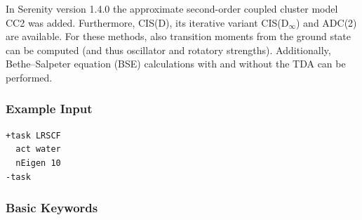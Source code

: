 \documentclass[bibliography=totocnumbered,a4paper,10pt,oneside]{scrbook}
\begin{document}
\noindent
In Serenity version 1.4.0 the approximate second-order coupled cluster model CC2 was added. Furthermore, CIS(D), its iterative variant CIS(D$_\infty$) and
ADC(2) are available. For these methods, also transition moments from the ground state can be computed (and thus oscillator and rotatory strengths).
Additionally, Bethe--Salpeter equation (BSE) calculations with and without the TDA can be performed.

\subsubsection{Example Input}
\begin{lstlisting}
+task LRSCF
  act water
  nEigen 10
-task
\end{lstlisting}
\subsubsection{Basic Keywords}
\end{document}

